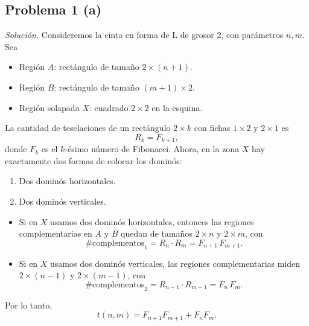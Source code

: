 \subsection*{Problema 1 (a)}
\emph{Solución.}
Consideremos la cinta en forma de L de grosor 2, con parámetros \(n,m\). Sea
\begin{itemize}
\item Región \(A\): rectángulo de tamaño \(2\times(n+1)\).
\item Región \(B\): rectángulo de tamaño \((m+1)\times2\).
\item Región solapada \(X\): cuadrado \(2\times2\) en la esquina.
\end{itemize}
La cantidad de teselaciones de un rectángulo \(2\times k\) con fichas \(1\times2\) y \(2\times1\) es
\[
R_k = F_{k+1},
\]
donde \(F_k\) es el \(k\)-ésimo número de Fibonacci. Ahora, en la zona \(X\) hay exactamente dos formas de colocar los dominós:
\begin{enumerate}
\item Dos dominós horizontales.
\item Dos dominós verticales.
\end{enumerate}
\begin{itemize}
\item Si en \(X\) usamos dos dominós horizontales, entonces las regiones complementarias en \(A\) y \(B\) quedan de tamaños \(2\times n\) y \(2\times m\), con
\[
\#\text{complementos}_1 = R_n\cdot R_m = F_{n+1}\,F_{m+1}.
\]
\item Si en \(X\) usamos dos dominós verticales, las regiones complementarias miden \(2\times(n-1)\) y \(2\times(m-1)\), con
\[
\#\text{complementos}_2 = R_{n-1}\cdot R_{m-1} = F_{n}\,F_{m}.
\]
\end{itemize}
Por lo tanto,
\[
t(n,m) = F_{n+1}F_{m+1} + F_n F_m.
\]
